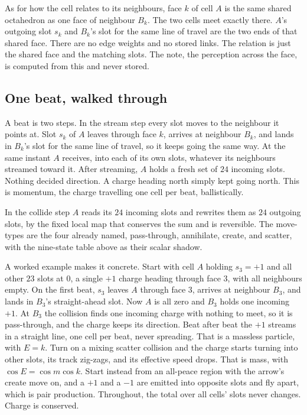 As for how the cell relates to its neighbours, face $k$ of cell $A$ is the same shared octahedron as one face of
neighbour $B_k$. The two cells meet exactly there. $A$'s outgoing slot $s_k$ and $B_k$'s slot for the same line of
travel are the two ends of that shared face. There are no edge weights and no stored links. The relation is just
the shared face and the matching slots. The note, the perception across the face, is computed from this and never
stored.

\subsection{One beat, walked through}

A beat is two steps. In the stream step every slot moves to the neighbour it points at. Slot $s_k$ of $A$ leaves
through face $k$, arrives at neighbour $B_k$, and lands in $B_k$'s slot for the same line of travel, so it keeps
going the same way. At the same instant $A$ receives, into each of its own slots, whatever its neighbours streamed
toward it. After streaming, $A$ holds a fresh set of $24$ incoming slots. Nothing decided direction. A charge
heading north simply kept going north. This is momentum, the charge travelling one cell per beat, ballistically.

In the collide step $A$ reads its $24$ incoming slots and rewrites them as $24$ outgoing slots, by the fixed local
map that conserves the sum and is reversible. The move-types are the four already named, pass-through, annihilate,
create, and scatter, with the nine-state table above as their scalar shadow.

A worked example makes it concrete. Start with cell $A$ holding $s_3 = +1$ and all other $23$ slots at $0$, a
single $+1$ charge heading through face $3$, with all neighbours empty. On the first beat, $s_3$ leaves $A$
through face $3$, arrives at neighbour $B_3$, and lands in $B_3$'s straight-ahead slot. Now $A$ is all zero and
$B_3$ holds one incoming $+1$. At $B_3$ the collision finds one incoming charge with nothing to meet, so it is
pass-through, and the charge keeps its direction. Beat after beat the $+1$ streams in a straight line, one cell
per beat, never spreading. That is a massless particle, with $E = k$. Turn on a mixing scatter collision and the
charge starts turning into other slots, its track zig-zags, and its effective speed drops. That is mass, with
$\cos E = \cos m \cos k$. Start instead from an all-peace region with the arrow's create move on, and a $+1$ and a
$-1$ are emitted into opposite slots and fly apart, which is pair production. Throughout, the total over all cells'
slots never changes. Charge is conserved.

